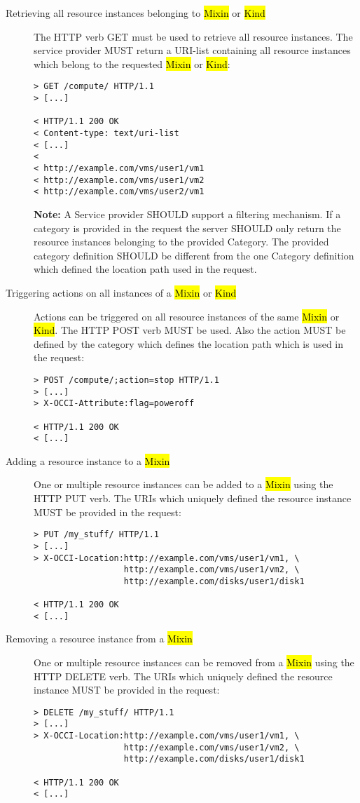 \documentclass[10pt,a4paper]{article}
\begin{document}
\begin{description}
\item[Retrieving all resource instances belonging to \hl{Mixin} or
  \hl{Kind}] The HTTP verb GET must be used to retrieve all resource
  instances. The service provider MUST return a URI-list containing
  all resource instances which belong to the requested \hl{Mixin} or
  \hl{Kind}:
\begin{verbatim}
> GET /compute/ HTTP/1.1
> [...]
 
< HTTP/1.1 200 OK
< Content-type: text/uri-list
< [...]
< 
< http://example.com/vms/user1/vm1
< http://example.com/vms/user1/vm2
< http://example.com/vms/user2/vm1
\end{verbatim}
\textbf{Note:} A Service provider SHOULD support a filtering
mechanism. If a category is provided in the request the server SHOULD
only return the resource instances belonging to the provided
Category. The provided category definition SHOULD be different from
the one Category definition which defined the location path used in
the request.

\item[Triggering actions on all instances of a \hl{Mixin} or
  \hl{Kind}] Actions can be triggered on all resource instances of the
  same \hl{Mixin} or \hl{Kind}. The HTTP POST verb MUST be used. Also
  the action MUST be defined by the category which defines the
  location path which is used in the request:
\begin{verbatim}
> POST /compute/;action=stop HTTP/1.1
> [...]
> X-OCCI-Attribute:flag=poweroff

< HTTP/1.1 200 OK
< [...]
\end{verbatim}

\item[Adding a resource instance to a \hl{Mixin}] One or multiple
  resource instances can be added to a \hl{Mixin} using the HTTP PUT
  verb. The URIs which uniquely defined the resource instance MUST be
  provided in the request:
\begin{verbatim}
> PUT /my_stuff/ HTTP/1.1
> [...]
> X-OCCI-Location:http://example.com/vms/user1/vm1, \
                  http://example.com/vms/user1/vm2, \
                  http://example.com/disks/user1/disk1

< HTTP/1.1 200 OK
< [...]
\end{verbatim}

\item[Removing a resource instance from a \hl{Mixin}] One or multiple
  resource instances can be removed from a \hl{Mixin} using the HTTP
  DELETE verb. The URIs which uniquely defined the resource instance
  MUST be provided in the request:
\begin{verbatim}
> DELETE /my_stuff/ HTTP/1.1
> [...]
> X-OCCI-Location:http://example.com/vms/user1/vm1, \
                  http://example.com/vms/user1/vm2, \
                  http://example.com/disks/user1/disk1

< HTTP/1.1 200 OK
< [...]
\end{verbatim}
\end{description}
\end{document}

